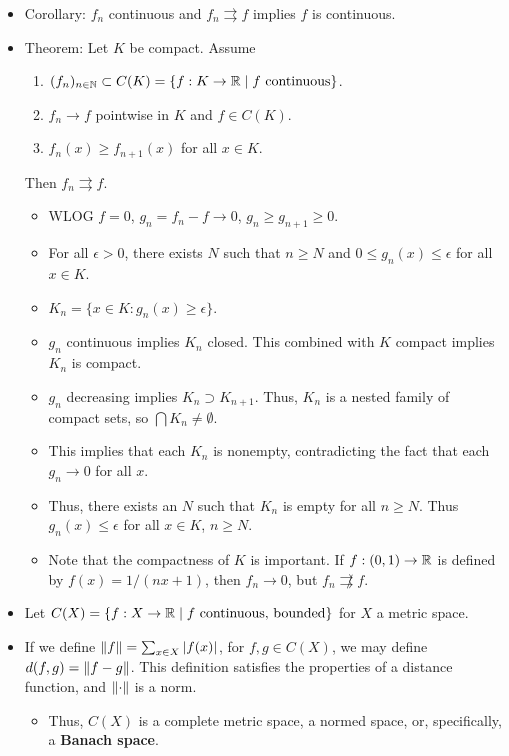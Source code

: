 \documentclass[../../notes.tex]{subfiles}
\begin{document}
\begin{itemize}
\begin{itemize}
    \end{itemize}
    \item Corollary: $f_n$ continuous and $f_n\rightrightarrows f$ implies $f$ is continuous.
    \item Theorem: Let $K$ be compact. Assume
    \begin{enumerate}[label={(\alph*)}]
        \item $(f_n)_{n\in\mathbb{N}}\subset C(K)=\{f:K\to\mathbb{R}\mid f\text{ continuous}\}$.
        \item $f_n\to f$ pointwise in $K$ and $f\in C(K)$.
        \item $f_n(x)\geq f_{n+1}(x)$ for all $x\in K$.
    \end{enumerate}
    Then $f_n\rightrightarrows f$.
    \begin{itemize}
        \item WLOG $f=0$, $g_n=f_n-f\to 0$, $g_n\geq g_{n+1}\geq 0$.
        \item For all $\epsilon>0$, there exists $N$ such that $n\geq N$ and $0\leq g_n(x)\leq\epsilon$ for all $x\in K$.
        \item $K_n=\{x\in K:g_n(x)\geq\epsilon\}$.
        \item $g_n$ continuous implies $K_n$ closed. This combined with $K$ compact implies $K_n$ is compact.
        \item $g_n$ decreasing implies $K_n\supset K_{n+1}$. Thus, $K_n$ is a nested family of compact sets, so $\bigcap K_n\neq\emptyset$.
        \item This implies that each $K_n$ is nonempty, contradicting the fact that each $g_n\to 0$ for all $x$.
        \item Thus, there exists an $N$ such that $K_n$ is empty for all $n\geq N$. Thus $g_n(x)\leq\epsilon$ for all $x\in K$, $n\geq N$.
        \item Note that the compactness of $K$ is important. If $f:(0,1)\to\mathbb{R}$ is defined by $f(x)=1/(nx+1)$, then $f_n\to 0$, but $f_n\not\rightrightarrows f$.
    \end{itemize}
    \item Let $C(X)=\{f:X\to\mathbb{R}\mid f\text{ continuous, bounded}\}$ for $X$ a metric space.
    \item If we define $\norm{f}=\sum_{x\in X}|f(x)|$, for $f,g\in C(X)$, we may define $d(f,g)=\norm{f-g}$. This definition satisfies the properties of a distance function, and $\norm{\cdot}$ is a norm.
    \begin{itemize}
        \item Thus, $C(X)$ is a complete metric space, a normed space, or, specifically, a \textbf{Banach space}.

\end{itemize}
\end{itemize}
\end{document}
